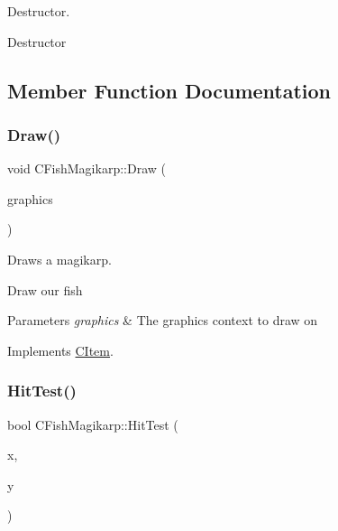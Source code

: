 Destructor. 

Destructor 

\subsection{Member Function Documentation}
\mbox{\label{class_c_fish_magikarp_acb88cf3659f4cebd4784e7039b541c33}} 
\subsubsection{\texorpdfstring{Draw()}{Draw()}}
{\footnotesize\ttfamily void C\+Fish\+Magikarp\+::\+Draw (\begin{DoxyParamCaption}\item[{Gdiplus\+::\+Graphics $\ast$}]{graphics }\end{DoxyParamCaption})\hspace{0.3cm}{\ttfamily [virtual]}}



Draws a magikarp. 

Draw our fish 
\begin{DoxyParams}{Parameters}
{\em graphics} & The graphics context to draw on \\
\hline
\end{DoxyParams}


Implements \hyperlink{class_c_item_a7ef8448d0c4bc53d0f1943a4dc817f6f}{C\+Item}.

\mbox{\label{class_c_fish_magikarp_ad23ff73aff08103618b8162dcaaf01b6}} 
\subsubsection{\texorpdfstring{Hit\+Test()}{HitTest()}}
{\footnotesize\ttfamily bool C\+Fish\+Magikarp\+::\+Hit\+Test (\begin{DoxyParamCaption}\item[{int}]{x,  }\item[{int}]{y }\end{DoxyParamCaption})\hspace{0.3cm}{\ttfamily [virtual]}}



